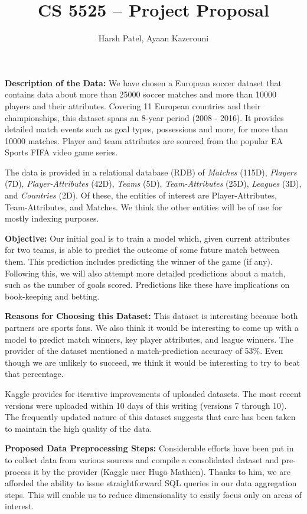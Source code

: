 \documentclass[11pt, letterpaper]{article}
\begin{document}
\title{CS 5525 -- Project Proposal}
\author{Harsh Patel, Ayaan Kazerouni}
\date{}
\maketitle
\textbf{Description of the Data:} We have chosen a European soccer dataset that contains data about more than 25000 soccer matches and more than 10000 players and their attributes.
Covering 11 European countries and their championships, this dataset spans an 8-year period (2008 - 2016).
It provides detailed match events such as goal types, possessions and more, for more than 10000 matches.
Player and team attributes are sourced from the popular EA Sports FIFA video game series.

The data is provided in a relational database (RDB) of \textit{Matches} (115D), \textit{Players} (7D), \textit{Player-Attributes} (42D), \textit{Teams} (5D), \textit{Team-Attributes} (25D), \textit{Leagues} (3D), and \textit{Countries} (2D).
Of these, the entities of interest are Player-Attributes, Team-Attributes, and Matches.
We think the other entities will be of use for mostly indexing purposes.

\textbf{Objective:} Our initial goal is to train a model which, given current attributes for two teams, is able to predict the outcome of some future match between them.
This prediction includes predicting the winner of the game (if any).
Following this, we will also attempt more detailed predictions about a match, such as the number of goals scored.
Predictions like these have implications on book-keeping and betting.

\textbf{Reasons for Choosing this Dataset:} This dataset is interesting because both partners are sports fans.
We also think it would be interesting to come up with a model to predict match winners, key player attributes, and league winners.
The provider of the dataset mentioned a match-prediction accuracy of 53\%.
Even though we are unlikely to succeed, we think it would be interesting to try to beat that percentage.

Kaggle provides for iterative improvements of uploaded datasets.
The most recent versions were uploaded within 10 days of this writing (versions 7 through 10).
The frequently updated nature of this dataset suggests that care has been taken to maintain the high quality of the data.

\textbf{Proposed Data Preprocessing Steps:} Considerable efforts have been put in to collect data from various sources and compile a consolidated dataset and pre-process it by the provider (Kaggle user Hugo Mathien).
Thanks to him, we are afforded the ability to issue straightforward SQL queries in our data aggregation steps.
This will enable us to reduce dimensionality to easily focus only on areas of interest.
\end{document}
